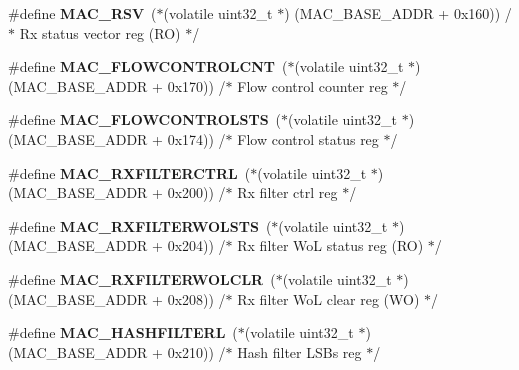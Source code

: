 \begin{DoxyCompactItemize}
\item 
\mbox{\label{group__lpc24xx__regs_ga1aea8be577f7b2bf106010d9438d2680}} 
\#define {\bfseries M\+A\+C\+\_\+\+R\+SV}~($\ast$(volatile uint32\+\_\+t $\ast$) (M\+A\+C\+\_\+\+B\+A\+S\+E\+\_\+\+A\+D\+DR + 0x160)) /$\ast$ Rx status vector reg (\+R\+O) $\ast$/
\item 
\mbox{\label{group__lpc24xx__regs_ga6ce222ef4e1bb570a21361206cf27db4}} 
\#define {\bfseries M\+A\+C\+\_\+\+F\+L\+O\+W\+C\+O\+N\+T\+R\+O\+L\+C\+NT}~($\ast$(volatile uint32\+\_\+t $\ast$) (M\+A\+C\+\_\+\+B\+A\+S\+E\+\_\+\+A\+D\+DR + 0x170)) /$\ast$ Flow control counter reg $\ast$/
\item 
\mbox{\label{group__lpc24xx__regs_ga5b713da427a1969317fc8ff752427b67}} 
\#define {\bfseries M\+A\+C\+\_\+\+F\+L\+O\+W\+C\+O\+N\+T\+R\+O\+L\+S\+TS}~($\ast$(volatile uint32\+\_\+t $\ast$) (M\+A\+C\+\_\+\+B\+A\+S\+E\+\_\+\+A\+D\+DR + 0x174)) /$\ast$ Flow control status reg $\ast$/
\item 
\mbox{\label{group__lpc24xx__regs_gaf63f725247aa569ecc3e6badb1d87519}} 
\#define {\bfseries M\+A\+C\+\_\+\+R\+X\+F\+I\+L\+T\+E\+R\+C\+T\+RL}~($\ast$(volatile uint32\+\_\+t $\ast$) (M\+A\+C\+\_\+\+B\+A\+S\+E\+\_\+\+A\+D\+DR + 0x200)) /$\ast$ Rx filter ctrl reg $\ast$/
\item 
\mbox{\label{group__lpc24xx__regs_ga2d4e48c0ab0ddf6f5cafaea016593436}} 
\#define {\bfseries M\+A\+C\+\_\+\+R\+X\+F\+I\+L\+T\+E\+R\+W\+O\+L\+S\+TS}~($\ast$(volatile uint32\+\_\+t $\ast$) (M\+A\+C\+\_\+\+B\+A\+S\+E\+\_\+\+A\+D\+DR + 0x204)) /$\ast$ Rx filter Wo\+L status reg (\+R\+O) $\ast$/
\item 
\mbox{\label{group__lpc24xx__regs_ga36dad4d0feda09627d41947e778b0c1e}} 
\#define {\bfseries M\+A\+C\+\_\+\+R\+X\+F\+I\+L\+T\+E\+R\+W\+O\+L\+C\+LR}~($\ast$(volatile uint32\+\_\+t $\ast$) (M\+A\+C\+\_\+\+B\+A\+S\+E\+\_\+\+A\+D\+DR + 0x208)) /$\ast$ Rx filter Wo\+L clear reg (\+W\+O) $\ast$/
\item 
\mbox{\label{group__lpc24xx__regs_gabb3544f86cb278f9edeb83cebc2d49a5}} 
\#define {\bfseries M\+A\+C\+\_\+\+H\+A\+S\+H\+F\+I\+L\+T\+E\+RL}~($\ast$(volatile uint32\+\_\+t $\ast$) (M\+A\+C\+\_\+\+B\+A\+S\+E\+\_\+\+A\+D\+DR + 0x210)) /$\ast$ Hash filter L\+S\+Bs reg $\ast$/

\end{DoxyCompactItemize}
